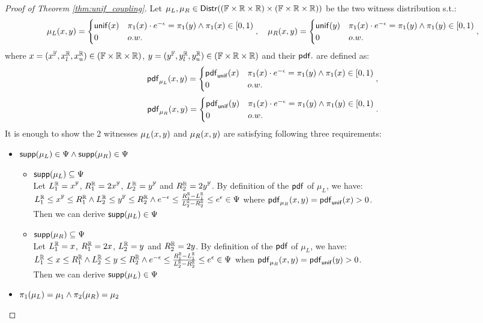 \documentclass[a4paper,11pt]{article}
\begin{document}
\begin{proof}[Proof of Theorem \ref{thm:unif_coupling}]
%
%
Let $\mu_L, \mu_R \in \mathsf{Distr}((\mathbb{F} \times \mathbb{R} \times \mathbb{R}) \times (\mathbb{F} \times \mathbb{R} \times \mathbb{R}))$ be the two witness distribution s.t.:
\[
	{\mu_L}(x, y) = 
	\begin{cases}
	{\mathsf{unif}}(x) & \pi_1(x) \cdot e^{-\epsilon} = \pi_1(y) \land \pi_1(x) \in [0, 1)\\
	0       & o.w.
	\end{cases},
~~~
	{\mu_R}(x, y) = 
	\begin{cases}
	{\mathsf{unif}}(y) & \pi_1(x) \cdot e^{-\epsilon} = \pi_1(y) \land \pi_1(y) \in [0, 1)\\
	0       & o.w.
	\end{cases},
\]
%
%
where $x = (x^{\mathbb{F}}, x^{\mathbb{R}}_l, x^{\mathbb{R}}_u) \in (\mathbb{F} \times \mathbb{R} \times \mathbb{R})$, $y = (y^{\mathbb{F}}, y^{\mathbb{R}}_l, y^{\mathbb{R}}_u ) \in (\mathbb{F} \times \mathbb{R} \times \mathbb{R})$ and their $\mathsf{pdf}.$ are defined as:
\[
	\mathsf{pdf}_{\mu_L}(x, y) = 
	\begin{cases}
	\mathsf{pdf}_{\mathsf{unif}}(x) & \pi_1(x) \cdot e^{-\epsilon} = \pi_1(y) \land \pi_1(x) \in [0, 1)\\
	0       & o.w.
	\end{cases},
\]
\[
	\mathsf{pdf}_{\mu_R}(x, y) = 
	\begin{cases}
	\mathsf{pdf}_{\mathsf{unif}}(y) & \pi_1(x) \cdot e^{-\epsilon} = \pi_1(y) \land \pi_1(y) \in [0, 1)\\
	0       & o.w.
	\end{cases}.
\]
It is enough to show the 2 witnesses $\mu_L(x, y)$ and $\mu_R(x, y)$ are satisfying following three requirements:
\begin{itemize}
	\item $\mathsf{supp}(\mu_L) \in \Psi \land \mathsf{supp}(\mu_R) \in \Psi$

	\begin{itemize}
		\item $\mathsf{supp}(\mu_L) \subseteq \Psi$ 
		\\
		Let $L^{\mathbb{R}}_1 = x^{\mathbb{F}}$, $R^{\mathbb{R}}_1 = 2x^{\mathbb{F}}$, $L^{\mathbb{R}}_2 = y^{\mathbb{F}}$ and $R^{\mathbb{R}}_2 = 2y^{\mathbb{F}}$. 
		By definition of the $\mathsf{pdf}$ of $\mu_L$, we have: 
		$L^{\mathbb{R}}_1 \leq x^{\mathbb{F}} \leq R^{\mathbb{R}}_1 
		\land L^{\mathbb{R}}_2 \leq y^{\mathbb{F}} \leq R^{\mathbb{R}}_2
		\land e^{-\epsilon} \leq 
		\frac{R^{\mathbb{R}}_1 - L^{\mathbb{R}}_1}{L^{\mathbb{R}}_2 - R^{\mathbb{R}}_2}
		\leq e^{\epsilon} \in \Psi$ where $\mathsf{pdf}_{\mu_R}(x, y) = \mathsf{pdf}_{\mathsf{unif}}(x) > 0$.
		\\%
		Then we can derive $\mathsf{supp}(\mu_L) \in \Psi$
		\item $\mathsf{supp}(\mu_R) \subseteq \Psi$
		\\
		Let $L^{\mathbb{R}}_1 = x$, $R^{\mathbb{R}}_1 = 2x$, $L^{\mathbb{R}}_2 = y$ and $R^{\mathbb{R}}_2 = 2y$. 
		By definition of the $\mathsf{pdf}$ of $\mu_L$, we have: 
		$L^{\mathbb{R}}_1 \leq x \leq R^{\mathbb{R}}_1 
		\land L^{\mathbb{R}}_2 \leq y \leq R^{\mathbb{R}}_2
		\land e^{-\epsilon} \leq 
		\frac{R^{\mathbb{R}}_1 - L^{\mathbb{R}}_1}{L^{\mathbb{R}}_2 - R^{\mathbb{R}}_2}
		\leq e^{\epsilon} \in \Psi$ when $\mathsf{pdf}_{\mu_R}(x, y) = \mathsf{pdf}_{\mathsf{unif}}(y) > 0$.
		\\
		Then we can derive $\mathsf{supp}(\mu_L) \in \Psi$
	\end{itemize}		
%
	\item $\pi_1(\mu_L) = \mu_1 \land \pi_2(\mu_R) = \mu_2$
	

\end{itemize}
\end{proof}
\end{document}
